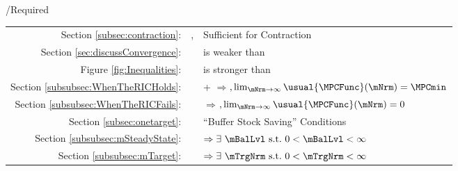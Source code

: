 \documentclass[\econtexRoot/BufferStockTheory]{subfiles}
\providecommand{\TblName}{}
\renewcommand{\TblName}{Required}
\begin{document}
\begin{verbatimwrite}{\TableDir/\TblName}
\begin{table}
{\begin{tabular}{|l|l|l|}
        \\ \cline{2-3}\multicolumn{1}{|r|}{Section \ref{subsec:contraction}:}                            & \FVAC, \WRIC                      & Sufficient for Contraction
        \\ \multicolumn{1}{|r|}{Section \ref{sec:discussConvergence}:}                               &                      & {\WRIC}{ is} weaker than \RIC 
        \\  \multicolumn{1}{|r|}{Figure \ref{fig:Inequalities}:}                                        &                                 & {\FVAC}{ is} stronger than \PFFVAC 
        \\ \multicolumn{1}{|r|}{Section \ref{subsubsec:WhenTheRICHolds}:}
                                                                                                                               &                                 & \cncl{\FHWC}+{\RIC} $\Rightarrow ${\GICRaw}$, \lim_{\mNrm \rightarrow \infty} \usual{\MPCFunc}(\mNrm)=\MPCmin$
        \\  \multicolumn{1}{|r|}{Section \ref{subsubsec:WhenTheRICFails}:}                                        &                                 & \cncl{\RIC}  $\Rightarrow $\cncl{\FHWC}$, \lim_{\mNrm \rightarrow \infty} \usual{\MPCFunc}(\mNrm)=0$
        \\ \cline{3-3}\multicolumn{1}{|r|}{Section \ref{subsec:onetarget}:}                                        &                                 & ``Buffer Stock Saving'' Conditions
        \\ \multicolumn{1}{|r|}{Section \ref{subsubsec:mSteadyState}:}                                        &                                 & \phantom{-Nrm}{\GICRaw} $\Rightarrow  \exists\phantom{~}\mBalLvl \phantom{~}\text{s.t.}\phantom{~} 0 < \mBalLvl < \infty$ %
        \\ \multicolumn{1}{|r|}{Section \ref{subsubsec:mTarget}:}                                        &                                 & {\GICMod} $\Rightarrow \exists \phantom{~} \mTrgNrm \phantom{~} \text{s.t.}\phantom{~} 0 < \mTrgNrm < \infty$ %
                                                                                                                           

\end{tabular}}
\end{table}
\end{verbatimwrite}
\end{document}
